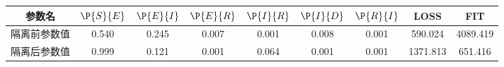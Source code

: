 \begin{tabular}{ccccccccc}
\hline
参数名&$\P{S}{E}$&$\P{E}{I}$&$\P{E}{R}$&$\P{I}{R}$&$\P{I}{D}$&$\P{R}{I}$&LOSS&FIT\\
\hline
隔离前参数值&0.540&0.245&0.007&0.001&0.008&0.001&590.024&4089.419\\
隔离后参数值&0.999&0.121&0.001&0.064&0.001&0.001&1371.813&651.416\\
\hline
\end{tabular}